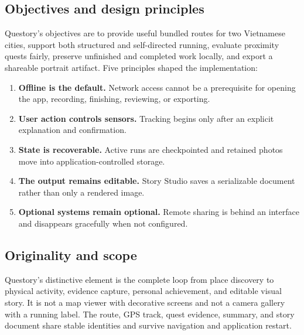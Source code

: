 \subsection{Objectives and design principles}
Questory's objectives are to provide useful bundled routes for two Vietnamese
cities, support both structured and self-directed running, evaluate proximity
quests fairly, preserve unfinished and completed work locally, and export a
shareable portrait artifact. Five principles shaped the implementation:

\begin{enumerate}
  \item \textbf{Offline is the default.} Network access cannot be a prerequisite
        for opening the app, recording, finishing, reviewing, or exporting.
  \item \textbf{User action controls sensors.} Tracking begins only after an
        explicit explanation and confirmation.
  \item \textbf{State is recoverable.} Active runs are checkpointed and retained
        photos move into application-controlled storage.
  \item \textbf{The output remains editable.} Story Studio saves a serializable
        document rather than only a rendered image.
  \item \textbf{Optional systems remain optional.} Remote sharing is behind an
        interface and disappears gracefully when not configured.
\end{enumerate}

\subsection{Originality and scope}
Questory's distinctive element is the complete loop from place discovery to
physical activity, evidence capture, personal achievement, and editable visual
story. It is not a map viewer with decorative screens and not a camera gallery
with a running label. The route, GPS track, quest evidence, summary, and story
document share stable identities and survive navigation and application restart.

